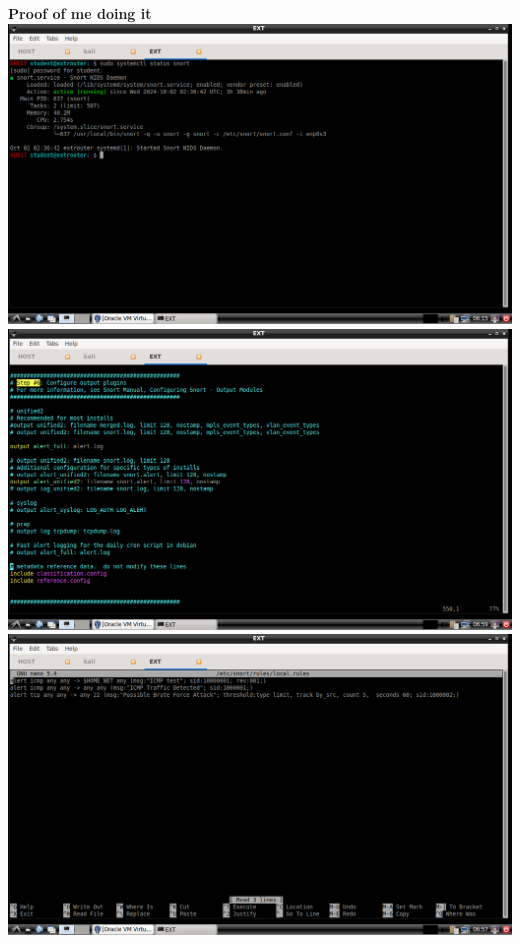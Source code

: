 \documentclass[12pt,a4paper]{report}
\begin{document}
\newpage

\textbf{Proof of me doing it}\\

\includegraphics[scale=.25]{snort active.png} \\
\includegraphics[scale=.25]{snort config.png} \\
\includegraphics[scale=.25]{rule config.png} \\
\end{document}
